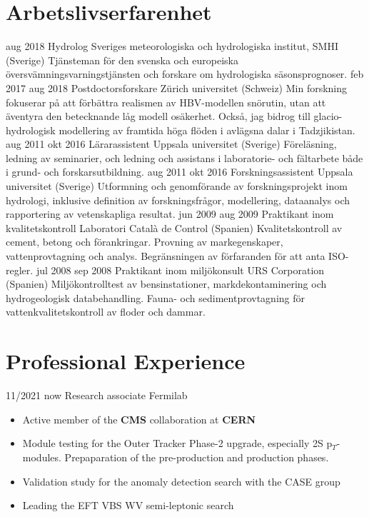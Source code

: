 \ifswedish
  \section{Arbetslivserfarenhet}
    \position
      {aug 2018 \textemdash{} }
      {Hydrolog}
      {Sveriges meteorologiska och hydrologiska institut, SMHI (Sverige)}
      {Tjänsteman för den svenska och europeiska översvämningsvarningstjänsten och forskare om hydrologiska säsonsprognoser.}
    \position
      {feb 2017 \textemdash{} aug 2018}
      {Postdoctorsforskare}
      {Zürich universitet (Schweiz)}
      {Min forskning fokuserar på att förbättra realismen av HBV-modellen snörutin, utan att äventyra den betecknande låg modell osäkerhet. Också, jag bidrog till glacio-hydrologisk modellering av framtida höga flöden i avlägsna dalar i Tadzjikistan.}
    \position
      {aug 2011 \textemdash{} okt 2016}
      {Lärarassistent}
      {Uppsala universitet (Sverige)}
      {Föreläsning, ledning av seminarier, och ledning och assistans i laboratorie- och fältarbete både i grund- och forskarsutbildning.}
    \position
      {aug 2011 \textemdash{} okt 2016}
      {Forskningsassistent}
      {Uppsala universitet (Sverige)}
      {Utformning och genomförande av forskningsprojekt inom hydrologi, inklusive definition av forskningsfrågor, modellering, dataanalys och rapportering av vetenskapliga resultat.}
    \position
      {jun 2009 \textemdash{} aug 2009}
      {Praktikant inom kvalitetskontroll}
      {Laboratori Català de Control (Spanien)}
      {Kvalitetskontroll av cement, betong och förankringar. Provning av markegenskaper, vattenprovtagning och analys. Begränsningen av förfaranden för att anta ISO-regler.}
    \position
      {jul 2008 \textemdash{} sep 2008}
      {Praktikant inom miljökonsult}
      {URS Corporation (Spanien)}
      {Miljökontrolltest av bensinstationer, markdekontaminering och hydrogeologisk databehandling. Fauna- och sedimentprovtagning för vattenkvalitetskontroll av floder och dammar.}
\else
  \section{Professional Experience}
   
  \position
  {11/2021  \textemdash{} now} 
   {Research associate}
   {Fermilab}
{\begin{itemize}
\item Active member of the {\bf CMS} collaboration at {\bf CERN}
\item Module testing for the Outer Tracker Phase-2 upgrade, especially 2S p$_T$-modules. Prepaparation of the pre-production and production phases.
\item Validation study for the anomaly detection search with the CASE group
\item Leading the EFT VBS WV semi-leptonic search
\end{itemize}
}

